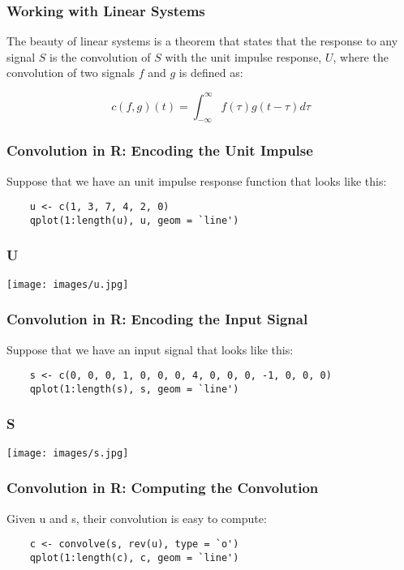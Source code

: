 \documentclass{beamer}
\begin{document}
\frame
{
	\frametitle{Working with Linear Systems}
	
	The beauty of linear systems is a theorem that states that the response to any signal $S$ is the convolution of $S$ with the unit impulse response, $U$, where the convolution of two signals $f$ and $g$ is defined as:
	
	\[
		c(f, g)(t) = \int_{- \infty}^{\infty} f(\tau)g(t - \tau) d\tau 
	\]
}

\begin{frame}[fragile]
	\frametitle{Convolution in R: Encoding the Unit Impulse}
	
	Suppose that we have an unit impulse response function that looks like this:
	
	\begin{verbatim}
	u <- c(1, 3, 7, 4, 2, 0)
	qplot(1:length(u), u, geom = `line')
	\end{verbatim}
\end{frame}

\frame
{
  \frametitle{U}
  
  \begin{center}
    \texttt{[image: images/u.jpg]}
  \end{center}
}

\begin{frame}[fragile]
	\frametitle{Convolution in R: Encoding the Input Signal}
	
	Suppose that we have an input signal that looks like this:
	\begin{verbatim}
	s <- c(0, 0, 0, 1, 0, 0, 0, 4, 0, 0, 0, -1, 0, 0, 0)
	qplot(1:length(s), s, geom = `line')
	\end{verbatim}
\end{frame}

\frame
{
  \frametitle{S}
  
  \begin{center}
    \texttt{[image: images/s.jpg]}
  \end{center}
}

\begin{frame}[fragile]
	\frametitle{Convolution in R: Computing the Convolution}
	
	Given u and s, their convolution is easy to compute:
	
	\begin{verbatim}
	c <- convolve(s, rev(u), type = `o')
	qplot(1:length(c), c, geom = `line')
	\end{verbatim}
\end{frame}
\end{document}
